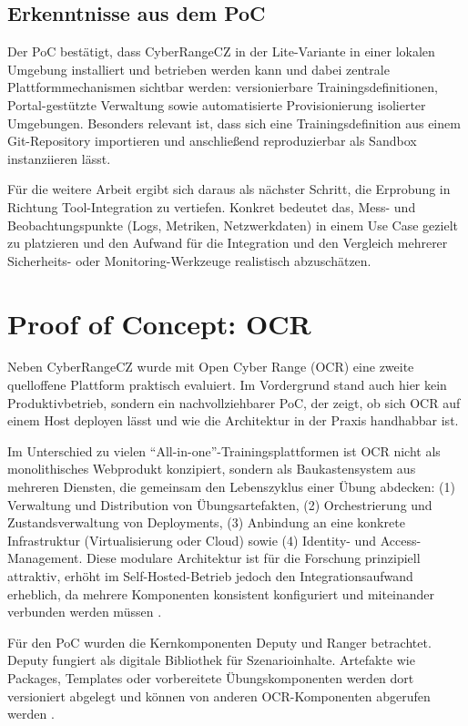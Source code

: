 \subsection{Erkenntnisse aus dem PoC}
\label{sec:poc-erkenntnisse}

Der PoC bestätigt, dass CyberRangeCZ in der Lite-Variante in einer lokalen Umgebung installiert und
betrieben werden kann und dabei zentrale Plattformmechanismen sichtbar werden: versionierbare
Trainingsdefinitionen, Portal-gestützte Verwaltung sowie automatisierte Provisionierung isolierter
Umgebungen. Besonders relevant ist, dass sich eine Trainingsdefinition aus einem Git-Repository
importieren und anschließend reproduzierbar als Sandbox instanziieren lässt.

Für die weitere Arbeit ergibt sich daraus als nächster Schritt, die Erprobung in Richtung
Tool-Integration zu vertiefen. Konkret bedeutet das, Mess- und Beobachtungspunkte (Logs, Metriken,
Netzwerkdaten) in einem Use Case gezielt zu platzieren und den Aufwand für die Integration und den
Vergleich mehrerer Sicherheits- oder Monitoring-Werkzeuge realistisch abzuschätzen.

\section{Proof of Concept: OCR}
\label{sec:poc-ocr}

Neben CyberRangeCZ wurde mit Open Cyber Range (OCR) eine zweite quelloffene Plattform praktisch
evaluiert. Im Vordergrund stand auch hier kein Produktivbetrieb, sondern ein nachvollziehbarer PoC,
der zeigt, ob sich OCR auf einem Host deployen lässt und wie die Architektur in der Praxis handhabbar
ist.

Im Unterschied zu vielen ``All-in-one''-Trainingsplattformen ist OCR nicht als monolithisches
Webprodukt konzipiert, sondern als Baukastensystem aus mehreren Diensten, die gemeinsam den
Lebenszyklus einer Übung abdecken: (1) Verwaltung und Distribution von Übungsartefakten, (2)
Orchestrierung und Zustandsverwaltung von Deployments, (3) Anbindung an eine konkrete Infrastruktur
(Virtualisierung oder Cloud) sowie (4) Identity- und Access-Management. Diese modulare Architektur
ist für die Forschung prinzipiell attraktiv, erhöht im Self-Hosted-Betrieb jedoch den
Integrationsaufwand erheblich, da mehrere Komponenten konsistent konfiguriert und miteinander
verbunden werden müssen \cite{OCRDeputyRepo,OCRCZRangerDoc}.

Für den PoC wurden die Kernkomponenten Deputy und Ranger betrachtet. Deputy fungiert als digitale
Bibliothek für Szenarioinhalte. Artefakte wie Packages, Templates oder vorbereitete
Übungskomponenten werden dort versioniert abgelegt und können von anderen OCR-Komponenten abgerufen
werden \cite{OCRDeputyRepo,OCRCZFirstDeputyPackage}.

